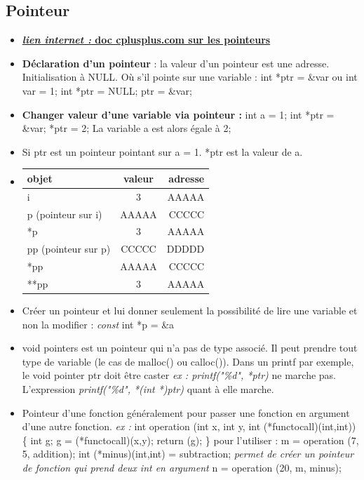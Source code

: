 \documentclass[12pt,a4paper]{article}
\begin{document}
\subsection{Pointeur}
\begin{itemize}
\item \href{http://www.cplusplus.com/doc/tutorial/pointers/}{\textbf{\textit{lien internet : }doc cplusplus.com sur les pointeurs}}
\item \textbf{Déclaration d'un pointeur} : la valeur d'un pointeur est une adresse. 
Initialisation à NULL.
Où s'il pointe sur une variable : int *ptr = \&var
ou int var = 1; int *ptr = NULL; ptr = \&var;
\item \textbf{Changer valeur d'une variable via pointeur : } int a = 1; int *ptr = \&var; *ptr = 2; La variable a est alors égale à 2;
\item Si ptr est un pointeur pointant sur a = 1. *ptr est la valeur de a.
\item \begin{tabular}{|l|c|r|}
  \hline
  objet & valeur & adresse \\
  \hline \hline
  i & 3 & AAAAA \\ \hline
  p (pointeur sur i) & AAAAA & CCCCC \\ \hline
  *p & 3 & AAAAA \\ \hline
  pp (pointeur sur p) & CCCCC & DDDDD \\ \hline
  *pp & AAAAA & CCCCC \\ \hline
  **pp & 3 & AAAAA \\ \hline
\end{tabular}
\item Créer un pointeur et lui donner seulement la possibilité de lire une variable et non la modifier : \textit{const} int *p = \&a
\item void pointers est un pointeur qui n'a pas de type associé. Il peut prendre tout type de variable (le cas de malloc() ou calloc()). Dans un printf par exemple, le void pointer ptr doit être caster \textit{ex : printf("\%d", *ptr)} ne marche pas. L'expression \textit{printf("\%d", *(int *)ptr)} quant à elle marche.
\item Pointeur d'une fonction généralement pour passer une fonction en argument d'une autre fonction. \textit{ex : }
\newline int operation (int x, int y, int (*functocall)(int,int)) \{
\newline int g;
\newline g = (*functocall)(x,y);
\newline return (g); \}
\newline pour l'utiliser : m = operation (7, 5, addition);
\newline int (*minus)(int,int) = subtraction; \textit{permet de créer un pointeur de fonction qui prend deux int en argument}
\newline n = operation (20, m, minus);
\end{itemize}
\end{document}

